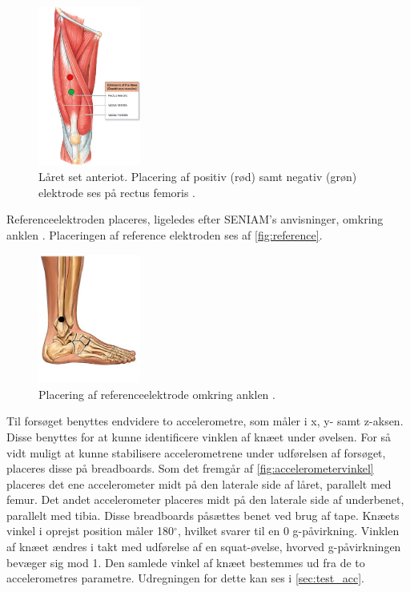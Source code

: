 \begin{figure}[H]
\centering
\includegraphics[width=0.3\textwidth]{figures/laarmuskel.png}
\caption{Låret set anteriot. Placering af positiv (rød) samt negativ (grøn) elektrode ses på rectus femoris \citep{martini2012}.}
\label{fig:laarmuskler}
\end{figure}

Referenceelektroden placeres, ligeledes efter SENIAM's anvisninger, omkring anklen \citep{seniam2016}. Placeringen af reference elektroden ses af \autoref{fig:reference}.

\begin{figure}[H]
\centering
\includegraphics[width=0.3\textwidth]{figures/reference}
\caption{Placering af referenceelektrode omkring anklen \citep{ankle2016}.}
\label{fig:reference}
\end{figure}

Til forsøget benyttes endvidere to accelerometre, som måler i x, y- samt z-aksen. Disse benyttes for at kunne identificere vinklen af knæet under øvelsen. For så vidt muligt at kunne stabilisere accelerometrene under udførelsen af forsøget, placeres disse på breadboards. 
Som det fremgår af \autoref{fig:accelerometervinkel} placeres det ene accelerometer midt på den laterale side af låret, parallelt med femur. Det andet accelerometer placeres midt på den laterale side af underbenet, parallelt med tibia. Disse breadboards påsættes benet ved brug af tape. Knæets vinkel i oprejst position måler 180$^{\circ}$, hvilket svarer til en 0 g-påvirkning. Vinklen af knæet ændres i takt med udførelse af en squat-øvelse, hvorved g-påvirkningen bevæger sig mod 1. Den samlede vinkel af knæet bestemmes ud fra de to accelerometres parametre. Udregningen for dette kan ses i \autoref{sec:test_acc}.

